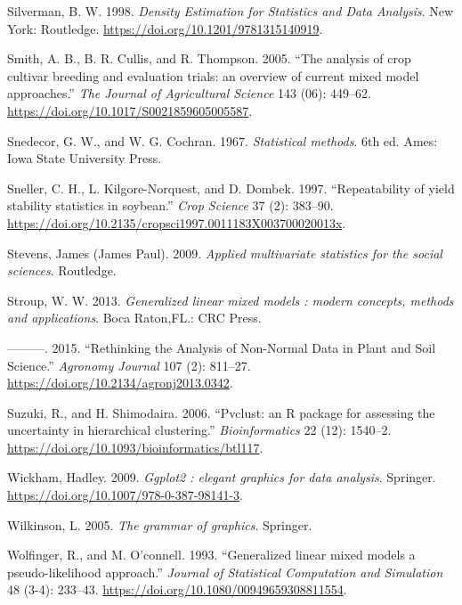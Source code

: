 \documentclass[
]{book}
\numberwithin{equation}{section}
\newlength{\cslhangindent}
\newenvironment{cslreferences}%
  {\setlength{\parindent}{0pt}%
  \everypar{\setlength{\hangindent}{\cslhangindent}}\ignorespaces}%
  {\par}
\begin{document}
\begin{cslreferences}
\leavevmode\hypertarget{ref-Silverman1998}{}%
Silverman, B. W. 1998. \emph{Density Estimation for Statistics and Data Analysis}. New York: Routledge. \url{https://doi.org/10.1201/9781315140919}.

\leavevmode\hypertarget{ref-Smith2005}{}%
Smith, A. B., B. R. Cullis, and R. Thompson. 2005. ``The analysis of crop cultivar breeding and evaluation trials: an overview of current mixed model approaches.'' \emph{The Journal of Agricultural Science} 143 (06): 449--62. \url{https://doi.org/10.1017/S0021859605005587}.

\leavevmode\hypertarget{ref-Snedecor1967}{}%
Snedecor, G. W., and W. G. Cochran. 1967. \emph{Statistical methods}. 6th ed. Ames: Iowa State University Press.

\leavevmode\hypertarget{ref-Sneller1997}{}%
Sneller, C. H., L. Kilgore-Norquest, and D. Dombek. 1997. ``Repeatability of yield stability statistics in soybean.'' \emph{Crop Science} 37 (2): 383--90. \url{https://doi.org/10.2135/cropsci1997.0011183X003700020013x}.

\leavevmode\hypertarget{ref-Stevens2009}{}%
Stevens, James (James Paul). 2009. \emph{Applied multivariate statistics for the social sciences}. Routledge.

\leavevmode\hypertarget{ref-Stroup2013}{}%
Stroup, W. W. 2013. \emph{Generalized linear mixed models : modern concepts, methods and applications}. Boca Raton,FL.: CRC Press.

\leavevmode\hypertarget{ref-Stroup2015}{}%
---------. 2015. ``Rethinking the Analysis of Non-Normal Data in Plant and Soil Science.'' \emph{Agronomy Journal} 107 (2): 811--27. \url{https://doi.org/10.2134/agronj2013.0342}.

\leavevmode\hypertarget{ref-Suzuki2006}{}%
Suzuki, R., and H. Shimodaira. 2006. ``Pvclust: an R package for assessing the uncertainty in hierarchical clustering.'' \emph{Bioinformatics} 22 (12): 1540--2. \url{https://doi.org/10.1093/bioinformatics/btl117}.

\leavevmode\hypertarget{ref-Wickham2009}{}%
Wickham, Hadley. 2009. \emph{Ggplot2 : elegant graphics for data analysis}. Springer. \url{https://doi.org/10.1007/978-0-387-98141-3}.

\leavevmode\hypertarget{ref-Wilkinson2005}{}%
Wilkinson, L. 2005. \emph{The grammar of graphics}. Springer.

\leavevmode\hypertarget{ref-Wolfinger1993}{}%
Wolfinger, R., and M. O'connell. 1993. ``Generalized linear mixed models a pseudo-likelihood approach.'' \emph{Journal of Statistical Computation and Simulation} 48 (3-4): 233--43. \url{https://doi.org/10.1080/00949659308811554}.


\end{cslreferences}
\end{document}
